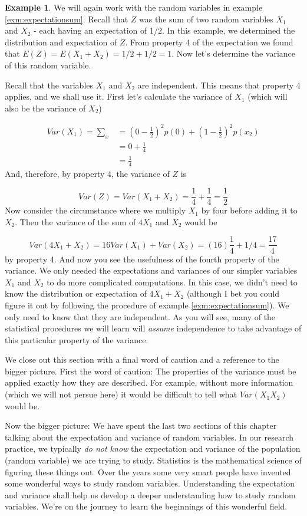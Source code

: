 \documentclass[
]{book}
\theoremstyle{definition}
\theoremstyle{definition}
\newtheorem{example}{Example}[chapter]
\theoremstyle{definition}
\theoremstyle{definition}
\theoremstyle{remark}
\begin{document}
\begin{example}
We will again work with the random variables in example \ref{exm:expectationsum}. Recall that \(Z\) was the sum of two random variables \(X_1\) and \(X_2\) - each having an expectation of 1/2. In this example, we determined the distribution and expectation of \(Z\). From property 4 of the expectation we found that \(E(Z) = E(X_1 + X_2) = 1/2 + 1/2 = 1\). Now let's determine the variance of this random variable.

Recall that the variables \(X_1\) and \(X_2\) are independent. This means that property 4 applies, and we shall use it. First let's calculate the variance of \(X_1\) (which will also be the variance of \(X_2\))

\begin{align}
Var(X_1) = \sum_{x}^{} &= (0-\frac{1}{2})^2p(0) + (1-\frac{1}{2})^2p(x_2) \\
&= 0 + \frac{1}{4} \\ &= \frac{1}{4}
\end{align}
And, therefore, by property 4, the variance of \(Z\) is

\[
Var(Z) = Var(X_1 + X_2) = \frac{1}{4} + \frac{1}{4} = \frac{1}{2}
\]
Now consider the circumstance where we multiply \(X_1\) by four before adding it to \(X_2\). Then the variance of the sum of \(4X_1\) and \(X_2\) would be

\[
Var(4X_1 + X_2) = 16Var(X_1) + Var(X_2) = (16) \frac{1}{4} + 1/4 = \frac{17}{4}
\]
by property 4. And now you see the usefulness of the fourth property of the variance. We only needed the expectations and variances of our simpler variables \(X_1\) and \(X_2\) to do more complicated computations. In this case, we didn't need to know the distribution or expectation of \(4X_1 + X_2\) (although I bet you could figure it out by following the procedure of example \ref{exm:expectationsum}). We only need to know that they are independent. As you will see, many of the statistical procedures we will learn will \emph{assume} independence to take advantage of this particular property of the variance.
\end{example}

We close out this section with a final word of caution and a reference to the bigger picture. First the word of caution: The properties of the variance must be applied exactly how they are described. For example, without more information (which we will not persue here) it would be difficult to tell what \(Var(X_1X_2)\) would be.

Now the bigger picture: We have spent the last two sections of this chapter talking about the expectation and variance of random variables. In our research practice, we typically \emph{do not know} the expectation and variance of the population (random variable) we are trying to study. Statistics is the mathematical science of figuring these things out. Over the years some very smart people have invented some wonderful ways to study random variables. Understanding the expectation and variance shall help us develop a deeper understanding how to study random variables. We're on the journey to learn the beginnings of this wonderful field.
\end{document}
